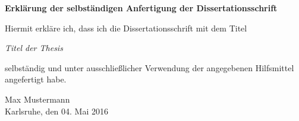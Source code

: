 \cleardoublepage
\thispagestyle{empty}
\null\vspace{10cm}
{\noindent\sffamily \textbf{Erklärung der selbständigen Anfertigung der
Dissertationsschrift}\hfill}
\vspace{1cm}

\noindent
Hiermit erkläre ich, dass ich die Dissertationsschrift mit dem Titel
%
\begin{center}
 \guillemotright
 \textit{Titel der Thesis}\guillemotleft\\[1.5ex]

\end{center}
%
selbständig und unter ausschließlicher Verwendung der angegebenen Hilfsmittel\\
angefertigt habe.
\vspace{12ex}

\noindent
\hrulefill\hspace{9cm}

\noindent
Max Mustermann\\
\noindent
Karlsruhe, den 04. Mai 2016


